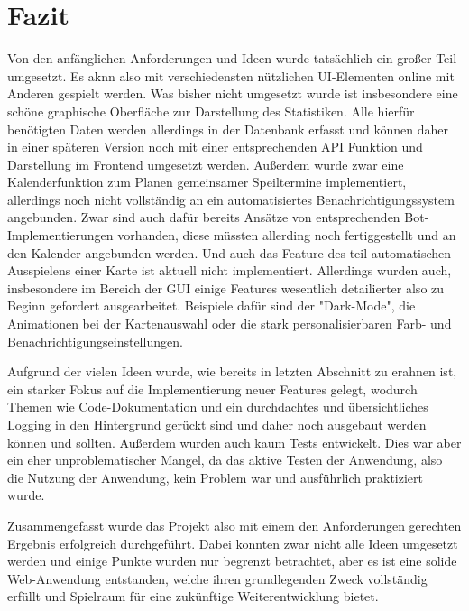 \chapter{Fazit}
Von den anfänglichen Anforderungen und Ideen wurde tatsächlich ein großer Teil umgesetzt. Es aknn also mit verschiedensten nützlichen UI-Elementen online mit Anderen gespielt werden. Was bisher nicht umgesetzt wurde ist insbesondere eine schöne graphische Oberfläche zur Darstellung des Statistiken. Alle hierfür benötigten Daten werden allerdings in der Datenbank erfasst und können daher in einer späteren Version noch mit einer entsprechenden API Funktion und Darstellung im Frontend umgesetzt werden. Außerdem wurde zwar eine Kalenderfunktion zum Planen gemeinsamer Speiltermine implementiert, allerdings noch nicht vollständig an ein automatisiertes Benachrichtigungssystem angebunden. Zwar sind auch dafür bereits Ansätze von entsprechenden Bot-Implementierungen vorhanden, diese müssten allerding noch fertiggestellt und an den Kalender angebunden werden. Und auch das Feature des teil-automatischen Ausspielens einer Karte ist aktuell nicht implementiert. Allerdings wurden auch, insbesondere im Bereich der GUI einige Features wesentlich detailierter also zu Beginn gefordert ausgearbeitet. Beispiele dafür sind der "Dark-Mode", die Animationen bei der Kartenauswahl oder die stark personalisierbaren Farb- und Benachrichtigungseinstellungen.

Aufgrund der vielen Ideen wurde, wie bereits in letzten Abschnitt zu erahnen ist, ein starker Fokus auf die Implementierung neuer Features gelegt, wodurch Themen wie Code-Dokumentation und ein durchdachtes und übersichtliches Logging in den Hintergrund gerückt sind und daher noch ausgebaut werden können und sollten. Außerdem wurden auch kaum Tests entwickelt. Dies war aber ein eher unproblematischer Mangel, da das aktive Testen der Anwendung, also die Nutzung der Anwendung, kein Problem war und ausführlich praktiziert wurde.

Zusammengefasst wurde das Projekt also mit einem den Anforderungen gerechten Ergebnis erfolgreich durchgeführt. Dabei konnten zwar nicht alle Ideen umgesetzt werden und einige Punkte wurden nur begrenzt betrachtet, aber es ist eine solide Web-Anwendung entstanden, welche ihren grundlegenden Zweck vollständig erfüllt und Spielraum für eine zukünftige Weiterentwicklung bietet.  
